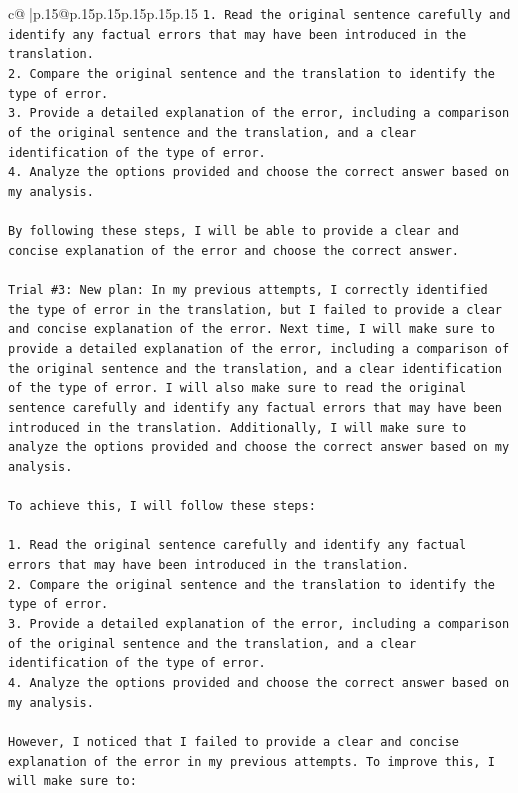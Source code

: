 \documentclass{article}
\begin{document}
{\begin{supertabular}{c@{$\;$}|p{.15\linewidth}@{}p{.15\linewidth}p{.15\linewidth}p{.15\linewidth}p{.15\linewidth}p{.15\linewidth}}
{{{\texttt{1. Read the original sentence carefully and identify any factual errors that may have been introduced in the translation.} \\
\texttt{2. Compare the original sentence and the translation to identify the type of error.} \\
\texttt{3. Provide a detailed explanation of the error, including a comparison of the original sentence and the translation, and a clear identification of the type of error.} \\
\texttt{4. Analyze the options provided and choose the correct answer based on my analysis.} \\
\\ 
\texttt{By following these steps, I will be able to provide a clear and concise explanation of the error and choose the correct answer.} \\
\\ 
\texttt{Trial \#3: New plan: In my previous attempts, I correctly identified the type of error in the translation, but I failed to provide a clear and concise explanation of the error. Next time, I will make sure to provide a detailed explanation of the error, including a comparison of the original sentence and the translation, and a clear identification of the type of error. I will also make sure to read the original sentence carefully and identify any factual errors that may have been introduced in the translation. Additionally, I will make sure to analyze the options provided and choose the correct answer based on my analysis.} \\
\\ 
\texttt{To achieve this, I will follow these steps:} \\
\\ 
\texttt{1. Read the original sentence carefully and identify any factual errors that may have been introduced in the translation.} \\
\texttt{2. Compare the original sentence and the translation to identify the type of error.} \\
\texttt{3. Provide a detailed explanation of the error, including a comparison of the original sentence and the translation, and a clear identification of the type of error.} \\
\texttt{4. Analyze the options provided and choose the correct answer based on my analysis.} \\
\\ 
\texttt{However, I noticed that I failed to provide a clear and concise explanation of the error in my previous attempts. To improve this, I will make sure to:} \\
}}}
\end{supertabular}}
\end{document}
